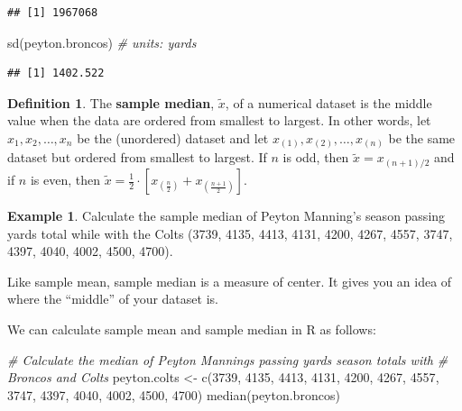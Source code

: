 \documentclass[
  11pt,
]{book}
\newenvironment{Shaded}{\begin{snugshade}}{\end{snugshade}}
\newcommand{\CommentTok}[1]{\textcolor[rgb]{0.56,0.35,0.01}{\textit{#1}}}
\newcommand{\DecValTok}[1]{\textcolor[rgb]{0.00,0.00,0.81}{#1}}
\newcommand{\FunctionTok}[1]{\textcolor[rgb]{0.00,0.00,0.00}{#1}}
\newcommand{\NormalTok}[1]{#1}
\newcommand{\OtherTok}[1]{\textcolor[rgb]{0.56,0.35,0.01}{#1}}
\theoremstyle{definition}
\newtheorem{definition}{Definition}[chapter]
\theoremstyle{definition}
\newtheorem{example}{Example}[chapter]
\theoremstyle{definition}
\theoremstyle{definition}
\theoremstyle{remark}
\begin{document}
\begin{verbatim}
## [1] 1967068
\end{verbatim}

\begin{Shaded}
\begin{Highlighting}[]
\FunctionTok{sd}\NormalTok{(peyton.broncos)  }\CommentTok{\# units: yards}
\end{Highlighting}
\end{Shaded}

\begin{verbatim}
## [1] 1402.522
\end{verbatim}

\begin{definition}
The \textbf{sample median}, \(\tilde{x}\), of a numerical dataset is the middle value when the data are ordered from smallest to largest. In other words, let \(x_1, x_2, \ldots, x_n\) be the (unordered) dataset and let \(x_{(1)},x_{(2)}, \ldots, x_{(n)}\) be the same dataset but ordered from smallest to largest. If \(n\) is odd, then \(\tilde{x} = x_{(n+1)/2}\) and if \(n\) is even, then \(\tilde{x} = \frac{1}{2} \cdot \left[x_{\left(\frac{n}{2}\right)} + x_{\left(\frac{n+1}{2}\right)}\right]\).
\end{definition}

\begin{example}
Calculate the sample median of Peyton Manning's season passing yards total while with the Colts (3739, 4135, 4413, 4131, 4200, 4267, 4557, 3747, 4397, 4040, 4002, 4500, 4700).
\end{example}

\hfill\break
\hfill\break
\hfill\break
\hfill\break
\hfill\break
\vfill

Like sample mean, sample median is a measure of center. It gives you an idea of where the ``middle'' of your dataset is.

We can calculate sample mean and sample median in R as follows:

\begin{Shaded}
\begin{Highlighting}[]
\CommentTok{\# Calculate the median of Peyton Manning\textquotesingle{}s passing yards season totals with}
\CommentTok{\# Broncos and Colts}
\NormalTok{peyton.colts }\OtherTok{\textless{}{-}} \FunctionTok{c}\NormalTok{(}\DecValTok{3739}\NormalTok{, }\DecValTok{4135}\NormalTok{, }\DecValTok{4413}\NormalTok{, }\DecValTok{4131}\NormalTok{, }\DecValTok{4200}\NormalTok{, }\DecValTok{4267}\NormalTok{, }\DecValTok{4557}\NormalTok{, }\DecValTok{3747}\NormalTok{, }\DecValTok{4397}\NormalTok{, }\DecValTok{4040}\NormalTok{, }\DecValTok{4002}\NormalTok{,}
    \DecValTok{4500}\NormalTok{, }\DecValTok{4700}\NormalTok{)}
\FunctionTok{median}\NormalTok{(peyton.broncos)}
\end{Highlighting}
\end{Shaded}
\end{document}
